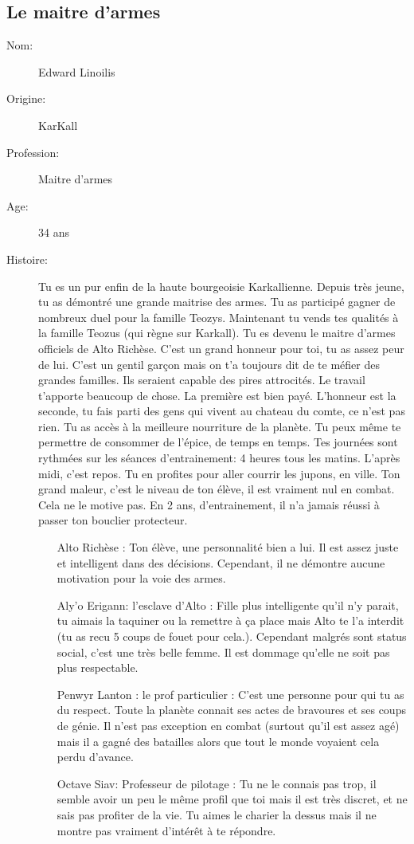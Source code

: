 \documentclass[oneside,12pt]{book}
\begin{document}
\begin{flushleft}
\clearpage
\section{Le maitre d'armes}
\begin{description}
\item[Nom:]{ Edward Linoilis}
\item[Origine:]{KarKall}
\item[Profession:]{Maitre d'armes}
\item[Age:]{34 ans}
\item[Histoire:]{
       Tu es un pur enfin de la haute bourgeoisie Karkallienne. Depuis très jeune, tu as démontré une grande maitrise des armes. Tu as participé gagner de nombreux duel pour la famille Teozys. Maintenant tu vends tes qualités à la famille
Teozus (qui règne sur Karkall). Tu es devenu le maitre d'armes officiels de Alto Richèse. C'est un grand honneur pour toi, tu as assez peur de lui. C'est un gentil garçon mais on t'a toujours dit de te méfier des grandes familles. Ils seraient capable des pires attrocités. Le travail t'apporte beaucoup de chose. La première est bien payé. L'honneur est la seconde, tu fais parti des gens qui vivent au chateau du comte, ce n'est pas rien. Tu as accès à la meilleure nourriture de la planète. Tu peux même te permettre de consommer de l'épice, de temps en temps. Tes journées sont rythmées sur les séances d'entrainement: 4 heures tous les matins. L'après midi, c'est repos. Tu en profites pour aller courrir les jupons, en ville. Ton grand maleur, c'est le niveau de ton élève, il est vraiment nul en combat. Cela ne le motive pas. En 2 ans, d'entrainement, il n'a jamais réussi à passer ton bouclier protecteur.     

}
		\begin{itemize}
		\item[Alto Richèse]: Ton élève, une personnalité bien a lui. Il est assez juste et intelligent dans des décisions. Cependant, il ne démontre aucune motivation pour la voie des armes. 
		\item[Aly'o Erigann: l'esclave d'Alto]: Fille plus intelligente qu'il n'y parait, tu aimais la taquiner ou la remettre à ça place mais Alto te l'a interdit (tu as recu 5 coups de fouet pour cela.). Cependant malgrés sont status social, c'est une très belle femme. Il est dommage qu'elle ne soit pas plus respectable.  
		\item[Penwyr Lanton : le prof particulier] : C'est une personne pour qui tu as du respect. Toute la planète connait ses actes de bravoures et ses coups de génie. Il n'est pas exception en combat (surtout qu'il est assez agé) mais il a gagné des batailles alors que tout le monde voyaient cela perdu d'avance. 
		\item[Octave Siav: Professeur de pilotage ]: Tu ne le connais pas trop, il semble avoir un peu le même profil que toi mais il est très discret, et ne sais pas profiter de la vie. Tu aimes le charier la dessus mais il ne montre pas vraiment d'intérêt à te répondre.
		\end{itemize} 
\clearpage
\end{description}


\end{flushleft}
\end{document}

